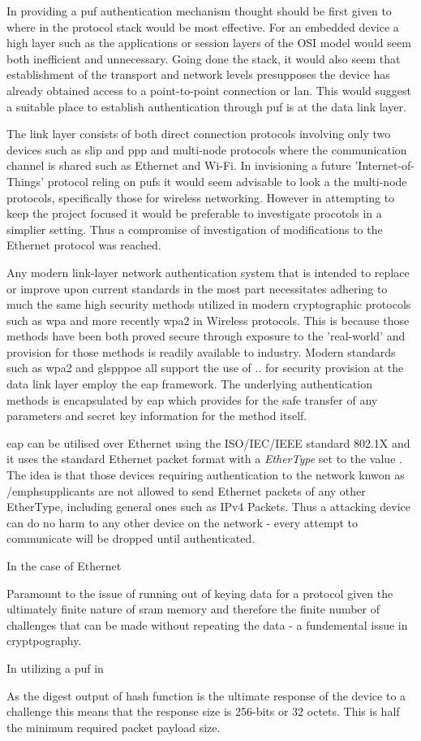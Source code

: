 In providing a \gls{puf} authentication mechanism thought should be first given
to where in the protocol stack would be most effective. For an embedded device
a high layer such as the applications or session layers of the OSI model would
seem both inefficient and unnecessary. Going done the stack, it would also seem
that establishment of the transport and network levels presupposes the device
has already obtained access to a point-to-point connection or \gls{lan}. This
would suggest a suitable place to establish authentication through \gls{puf} is
at the data link layer.

The link layer consists of both direct connection protocols involving only two
devices such as \gls{slip} and \gls{ppp} and multi-node protocols where the
communication channel is shared such as Ethernet and Wi-Fi. In invisioning a
future 'Internet-of-Things' protocol reling on \glspl{puf} it would seem
advisable to look a the multi-node protocols, specifically those for wireless
networking.
However in attempting to keep the project focused it would be preferable to
investigate procotols in a simplier setting. Thus a compromise of investigation
of modifications to the Ethernet protocol was reached.

Any modern link-layer network authentication system that is intended to
replace or improve upon current standards in the most part necessitates
adhering to much the same high security methods utilized in modern cryptographic
protocols such as  \gls{wpa} and more recently \gls{wpa2} in Wireless protocols.
This is because those methods have been both proved secure through exposure to
the 'real-world' and provision for those methods is readily available to
industry. Modern standards such as \gls{wpa2} and gls{pppoe} all support the use
of .. for security provision at the data link layer employ
the \gls{eap} framework. The underlying authentication methods is encapsulated
by \gls{eap} which provides for the safe transfer of any parameters and secret
key information for the method itself.

\Gls{eap} can be utilised over Ethernet using the ISO/IEC/IEEE standard
802.1X\cite{8802-1x} and it uses the standard Ethernet packet format with a
\emph{EtherType} set to the value .
The idea is that those devices requiring authentication to the network knwon as
/emph{supplicants} are not allowed to send Ethernet packets of any other 
EtherType, including general ones such as  IPv4 Packets.
Thus a attacking device can do no harm to any other device on the network -
every attempt to communicate will be dropped until authenticated.

In the case of Ethernet 

Paramount to the issue of running out of keying data for a protocol given the ultimately finite nature of \gls{sram} memory and therefore the finite number of challenges that can be made without repeating the data - a fundemental issue in cryptpography. 

In utilizing a \gls{puf} in 

As the digest output of hash function is the ultimate response of the device
to a challenge this means that the response size is 256-bits or 32 octets.
This is half the minimum required packet payload size.